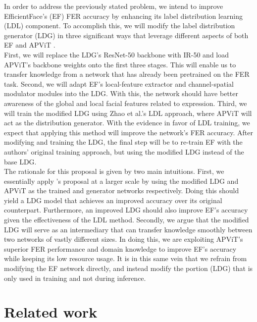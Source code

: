 \documentclass[../main.tex]{subfiles}
\begin{document}
In order to address the previously stated problem, we intend to improve EfficientFace's (EF) \cite{eff-face2021} FER accuracy by enhancing its label distribution learning (LDL) component.
To accomplish this, we will modify the label distribution generator (LDG) in three significant ways that leverage different aspects of both EF and APViT \cite{apvit2023}.\\

First, we will replace the LDG's ResNet-50 backbone with IR-50 \cite{deng2019ir50} and load APViT's backbone weights onto the first three stages.
This will enable us to transfer knowledge from a network that has already been pretrained on the FER task.
Second, we will adapt EF's local-feature extractor and channel-spatial modulator modules into the LDG.
With this, the network should have better awareness of the global and local facial features related to expression.
Third, we will train the modified LDG using Zhao et al.'s \cite{eff-face2021} LDL approach, where APViT will act as the distribution generator.
With the evidence \cite{eff-face2021} in favor of LDL training, we expect that applying this method will improve the network's FER accuracy.
After modifying and training the LDG, the final step will be to re-train EF with the authors' original training approach, but using the modified LDG instead of the base LDG.\\

The rationale for this proposal is given by two main intuitions.
First, we essentially apply \cite{eff-face2021}'s proposal at a larger scale by using the modified LDG and APViT as the trained and generator networks respectively.
Doing this should yield a LDG model that achieves an improved accuracy over its original counterpart.
Furthermore, an improved LDG should also improve EF's accuracy given the effectiveness of the LDL method.
Secondly, we argue that the modified LDG will serve as an intermediary that can transfer knowledge smoothly between two networks of vastly different sizes.
In doing this, we are exploiting APViT's superior FER performance and domain knowledge to improve EF's accuracy while keeping its low resource usage.
It is in this same vein that we refrain from modifying the EF network directly, and instead modify the portion (LDG) that is only used in training and not during inference.\\

\section{Related work}
\end{document}
